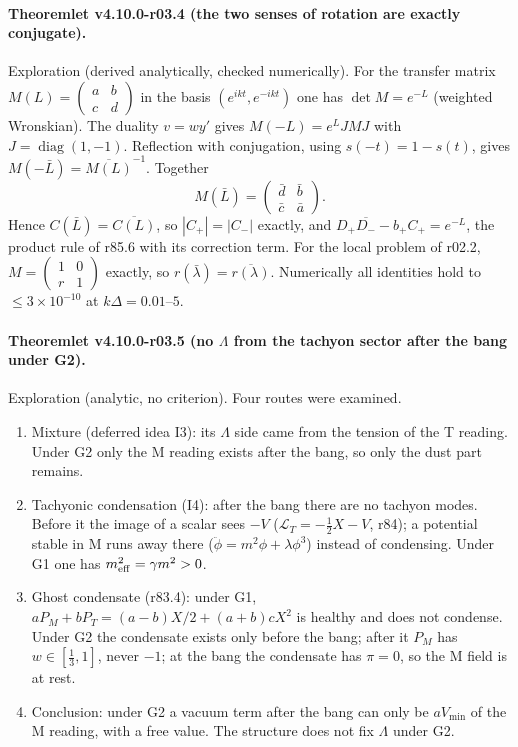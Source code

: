 \paragraph{Theoremlet v4.10.0-r03.4 (the two senses of rotation are exactly conjugate).}
Exploration (derived analytically, checked numerically).  For the transfer matrix \(M(L)=\begin{pmatrix}a&b\\c&d\end{pmatrix}\) in the basis
\((e^{ikt},e^{-ikt})\) one has \(\det M=e^{-L}\) (weighted Wronskian).  The duality \(v=wy'\) gives \(M(-L)=e^L JMJ\) with \(J=\operatorname{diag}(1,-1)\).  Reflection
with conjugation, using \(s(-t)=1-s(t)\), gives \(M(-\bar L)=\overline{M(L)}^{-1}\).  Together
\[
M(\bar L)=\begin{pmatrix}\bar d&\bar b\\ \bar c&\bar a\end{pmatrix}.
\]
Hence \(C(\bar L)=\overline{C(L)}\), so \(|C_+|=|C_-|\) exactly, and \(D_+\overline{D_-}-b_+C_+=e^{-L}\), the product rule of r85.6 with its correction term.  For
the local problem of r02.2, \(M=\begin{pmatrix}1&0\\r&1\end{pmatrix}\) exactly, so \(r(\bar\lambda)=\overline{r(\lambda)}\).  Numerically all identities hold to
\(\le3\times10^{-10}\) at \(k\Delta=0.01\)--\(5\).

\paragraph{Theoremlet v4.10.0-r03.5 (no \(\Lambda\) from the tachyon sector after the bang under G2).}
Exploration (analytic, no criterion).  Four routes were examined.
\begin{enumerate}[leftmargin=2em]
\item[(a)] Mixture (deferred idea I3): its \(\Lambda\) side came from the tension of the T reading.  Under G2 only the M reading exists after the bang, so
only the dust part remains.
\item[(b)] Tachyonic condensation (I4): after the bang there are no tachyon modes.  Before it the image of a scalar sees \(-V\) (\(\mathcal L_T=-\tfrac12X-V\),
r84); a potential stable in M runs away there (\(\ddot\phi=m^2\phi+\lambda\phi^3\)) instead of condensing.  Under G1 one has \(m_{\rm eff}^2=\gamma m^2>0\).
\item[(c)] Ghost condensate (r83.4): under G1, \(aP_M+bP_T=(a-b)X/2+(a+b)cX^2\) is healthy and does not condense.  Under G2 the condensate exists only
before the bang; after it \(P_M\) has \(w\in[\tfrac13,1]\), never \(-1\); at the bang the condensate has \(\pi=0\), so the M field is at rest.
\item[(d)] Conclusion: under G2 a vacuum term after the bang can only be \(aV_{\min}\) of the M reading, with a free value.  The structure does not fix
\(\Lambda\) under G2.
\end{enumerate}

